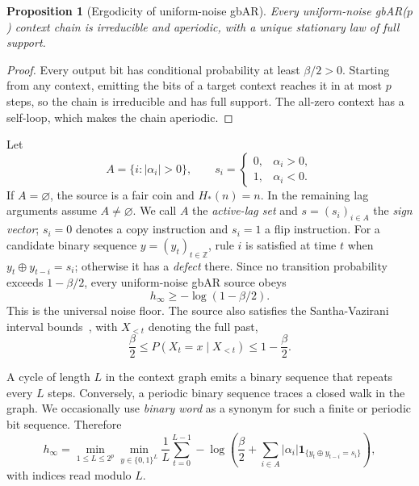 \documentclass[11pt,a4paper]{article}
\providecommand{\mathds}[1]{\mathbf{#1}}
\newtheorem{proposition}[theorem]{Proposition}
\begin{document}
\begin{proposition}[Ergodicity of uniform-noise gbAR]
\label{prop:gbar_ergodicity}
Every uniform-noise gbAR($p$) context chain is irreducible and
aperiodic, with a unique stationary law of full support.
\end{proposition}

\begin{proof}
Every output bit has conditional probability at least $\beta/2>0$.
Starting from any context, emitting the bits of a target context reaches
it in at most $p$ steps, so the chain is irreducible and has full
support.  The all-zero context has a self-loop, which makes the chain
aperiodic.
\end{proof}

Let
\[
    A=\{i:|\alpha_i|>0\},
    \qquad
    s_i=\begin{cases}0,&\alpha_i>0,\\1,&\alpha_i<0.\end{cases}
\]
If $A=\varnothing$, the source is a fair coin and $H_*(n)=n$.
In the remaining lag arguments assume $A\ne\varnothing$.
We call $A$ the \emph{active-lag set} and $s=(s_i)_{i\in A}$ the
\emph{sign vector}; $s_i=0$ denotes a copy instruction and $s_i=1$ a
flip instruction.  For a candidate binary sequence $y=(y_t)_{t\in\mathbb Z}$,
rule $i$ is satisfied at time $t$ when $y_t\oplus y_{t-i}=s_i$;
otherwise it has a \emph{defect} there.
Since no transition probability exceeds
$1-\beta/2$, every uniform-noise gbAR source obeys
\begin{equation}
\label{eq:noise_floor}
    h_\infty\ge-\log(1-\beta/2).
\end{equation}
This is the universal noise floor.  The source also satisfies the
Santha-Vazirani interval bounds~\cite{santha1986generating,chor1988unbiased},
with $X_{<t}$ denoting the full past,
\[
    \frac{\beta}{2}
    \le P(X_t=x\mid X_{<t})
    \le1-\frac{\beta}{2}.
\]

A cycle of length $L$ in the context graph emits a binary sequence that
repeats every $L$ steps.  Conversely, a periodic binary sequence traces
a closed walk in the graph.  We occasionally use \emph{binary word} as
a synonym for such a finite or periodic bit sequence.  Therefore
\begin{equation}
\label{eq:periodic_variational}
    h_\infty=
    \min_{1\le L\le2^p}\min_{y\in\{0,1\}^L}
    \frac1L\sum_{t=0}^{L-1}
    -\log\left(
        \frac{\beta}{2}
        +\sum_{i\in A}|\alpha_i|
        \mathds{1}_{\{y_t\oplus y_{t-i}=s_i\}}
    \right),
\end{equation}
with indices read modulo $L$.
\end{document}

